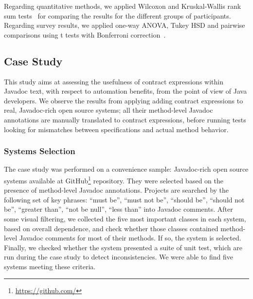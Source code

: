 Regarding quantitative methods, we applied Wilcoxon and Kruskal-Wallis rank sum tests~\cite{statistical} for comparing the results for the different groups of participants. Regarding survey results, we applied one-way ANOVA, Tukey HSD and pairwise comparisons using t tests with Bonferroni correction~\cite{statistical}.%

\subsection{Case Study}
\label{sec:caseStudy}
This study aims at assessing the usefulness of contract expressions within Javadoc text, with respect to automation benefits, from the point of view of Java developers. 
We observe the results from applying adding contract expressions to \totalSystems{} real, Javadoc-rich open source systems; all their method-level Javadoc annotations are manually translated to contract expressions, before running tests looking for mismatches between specifications and actual method behavior.

\subsubsection{Systems Selection} 
\label{sec:systems}

The case study was performed on a convenience sample: \totalSystems{} Javadoc-rich open source systems available at GitHub\footnote{\url{https://github.com/}} repository.
They were selected based on the presence of method-level Javadoc annotations. 
Projects are searched by the following set of key phrases: ``must be'', ``must not be'', ``should
be'', ``should not be'', ``greater than'', ``not be null'', ``less than'' into Javadoc
comments.
After some visual filtering, we collected the five most important classes in
each system, based on overall dependence, and check whether those classes
contained method-level Javadoc comments for most of their methods. If so, the
system is selected. Finally, we checked whether the system presented a suite of
unit test, which are run during the case study to detect inconsistencies. We
were able to find five systems meeting these criteria.

